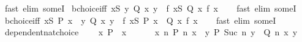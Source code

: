 \begin{isabellebody}
\ {\isacharparenleft}{\kern0pt}fast\ elim{\isacharcolon}{\kern0pt}\ someI{\isacharparenright}{\kern0pt}%
\endisatagproof
{\isafoldproof}%
%
\isadelimproof
\isanewline
%
\endisadelimproof
\isanewline
{}\isamarkupfalse%
\ bchoice{\isacharunderscore}{\kern0pt}iff{\isacharcolon}{\kern0pt}\ {\isachardoublequoteopen}{\isacharparenleft}{\kern0pt}{\isasymforall}x{\isasymin}S{\isachardot}{\kern0pt}\ {\isasymexists}y{\isachardot}{\kern0pt}\ Q\ x\ y{\isacharparenright}{\kern0pt}\ {\isasymlongleftrightarrow}\ {\isacharparenleft}{\kern0pt}{\isasymexists}f{\isachardot}{\kern0pt}\ {\isasymforall}x{\isasymin}S{\isachardot}{\kern0pt}\ Q\ x\ {\isacharparenleft}{\kern0pt}f\ x{\isacharparenright}{\kern0pt}{\isacharparenright}{\kern0pt}{\isachardoublequoteclose}\isanewline
%
\isadelimproof
\ \ %
\endisadelimproof
%
\isatagproof
{}\isamarkupfalse%
\ {\isacharparenleft}{\kern0pt}fast\ elim{\isacharcolon}{\kern0pt}\ someI{\isacharparenright}{\kern0pt}%
\endisatagproof
{\isafoldproof}%
%
\isadelimproof
\isanewline
%
\endisadelimproof
\isanewline
{}\isamarkupfalse%
\ bchoice{\isacharunderscore}{\kern0pt}iff{\isacharprime}{\kern0pt}{\isacharcolon}{\kern0pt}\ {\isachardoublequoteopen}{\isacharparenleft}{\kern0pt}{\isasymforall}x{\isasymin}S{\isachardot}{\kern0pt}\ P\ x\ {\isasymlongrightarrow}\ {\isacharparenleft}{\kern0pt}{\isasymexists}y{\isachardot}{\kern0pt}\ Q\ x\ y{\isacharparenright}{\kern0pt}{\isacharparenright}{\kern0pt}\ {\isasymlongleftrightarrow}\ {\isacharparenleft}{\kern0pt}{\isasymexists}f{\isachardot}{\kern0pt}\ {\isasymforall}x{\isasymin}S{\isachardot}{\kern0pt}\ P\ x\ {\isasymlongrightarrow}\ Q\ x\ {\isacharparenleft}{\kern0pt}f\ x{\isacharparenright}{\kern0pt}{\isacharparenright}{\kern0pt}{\isachardoublequoteclose}\isanewline
%
\isadelimproof
\ \ %
\endisadelimproof
%
\isatagproof
{}\isamarkupfalse%
\ {\isacharparenleft}{\kern0pt}fast\ elim{\isacharcolon}{\kern0pt}\ someI{\isacharparenright}{\kern0pt}%
\endisatagproof
{\isafoldproof}%
%
\isadelimproof
\isanewline
%
\endisadelimproof
\isanewline
{}\isamarkupfalse%
\ dependent{\isacharunderscore}{\kern0pt}nat{\isacharunderscore}{\kern0pt}choice{\isacharcolon}{\kern0pt}\isanewline
\ \ \ {}{\isacharcolon}{\kern0pt}\ {\isachardoublequoteopen}{\isasymexists}x{\isachardot}{\kern0pt}\ P\ {}\ x{\isachardoublequoteclose}\isanewline
\ \ \ \ \ {}{\isacharcolon}{\kern0pt}\ {\isachardoublequoteopen}{\isasymAnd}x\ n{\isachardot}{\kern0pt}\ P\ n\ x\ {\isasymLongrightarrow}\ {\isasymexists}y{\isachardot}{\kern0pt}\ P\ {\isacharparenleft}{\kern0pt}Suc\ n{\isacharparenright}{\kern0pt}\ y\ {\isasymand}\ Q\ n\ x\ y{\isachardoublequoteclose}\isanewline

\end{isabellebody}
